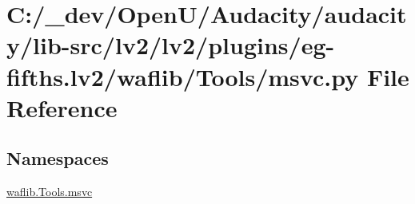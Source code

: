 \hypertarget{lv2_2plugins_2eg-fifths_8lv2_2waflib_2_tools_2msvc_8py}{}\section{C\+:/\+\_\+dev/\+Open\+U/\+Audacity/audacity/lib-\/src/lv2/lv2/plugins/eg-\/fifths.lv2/waflib/\+Tools/msvc.py File Reference}
\label{lv2_2plugins_2eg-fifths_8lv2_2waflib_2_tools_2msvc_8py}
\subsection*{Namespaces}
\begin{DoxyCompactItemize}
\item 
 \hyperlink{namespacewaflib_1_1_tools_1_1msvc}{waflib.\+Tools.\+msvc}
\end{DoxyCompactItemize}
